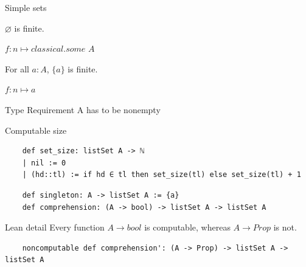 \documentclass[aspectratio=169]{beamer}
\begin{document}
\begin{frame}[fragile]{Simple sets}
    \begin{lemma}
        $ \varnothing $ is finite.
    \end{lemma}
    $f: n \mapsto classical.some $ $A$
    \begin{lemma}
        For all $a:A$, $\{ a\}$ is finite.
    \end{lemma}
    $f: n \mapsto a$
    \begin{block}{Type Requirement}
    A has to be nonempty
    \end{block}
\end{frame}
\begin{frame}[fragile]{Computable size}
    \begin{lstlisting}
    def set_size: listSet A -> ℕ
    | nil := 0
    | (hd::tl) := if hd ∈ tl then set_size(tl) else set_size(tl) + 1
    \end{lstlisting}
    \begin{lstlisting}
    def singleton: A -> listSet A := {a}
    def comprehension: (A -> bool) -> listSet A -> listSet A
    \end{lstlisting}
    \begin{block}{Lean detail}
        Every function $A \to bool$ is computable, whereas $A \to Prop$ is not.
    \end{block}
    
    
    \begin{lstlisting}
    noncomputable def comprehension': (A -> Prop) -> listSet A -> listSet A
    \end{lstlisting}
    \end{frame}
\end{document}
